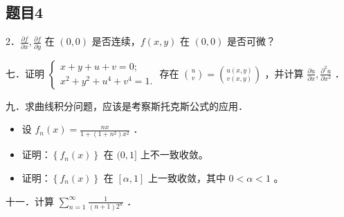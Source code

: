 \documentclass{article}
\begin{document}
\subsection{题目4}
2．\(\frac{\partial f}{\partial x}, \frac{\partial f}{\partial y}\) 在 \((0,0)\) 是否连续，\(f(x, y)\) 在 \((0,0)\) 是否可微？

七．证明 \(\left\{\begin{array}{l}x+y+u+v=0 ; \\ x^{2}+y^{2}+u^{4}+v^{4}=1 .\end{array}\right.\) 存在 \(\binom{u}{v}=\binom{u(x, y)}{v(x, y)}\) ，并计算 \(\frac{\partial u}{\partial x}, \frac{\partial^{2} u}{\partial x^{2}}\) ．

九．求曲线积分问题，应该是考察斯托克斯公式的应用．

\begin{itemize}
  \item[十．] 设 \(f_{n}(x)=\frac{n x}{1+\left(1+n^{2}\right) x^{2}}\) ．

  \item[1．] 证明：\(\left\{f_{n}(x)\right\}\) 在 \((0,1]\) 上不一致收敛。

  \item[2．] 证明：\(\left\{f_{n}(x)\right\}\) 在 \([\alpha, 1]\) 上一致收敛，其中 \(0<\alpha<1\) 。
\end{itemize}

十一．计算 \(\sum_{n=1}^{\infty} \frac{1}{(n+1) 2^{n}}\) ．
\end{document}
